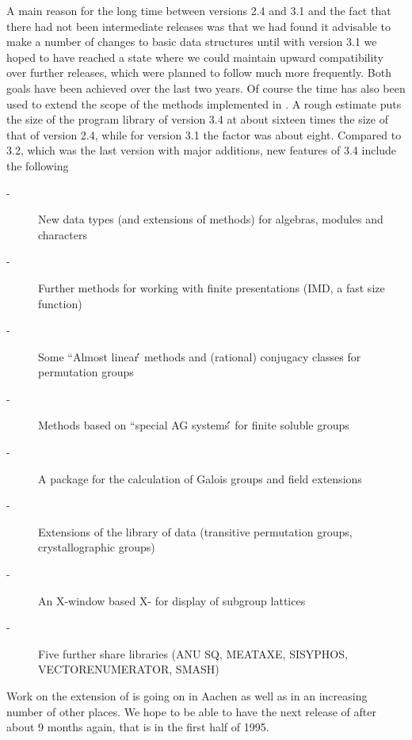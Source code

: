 A main reason for the long time between versions 2.4 and 3.1 and the fact
that there had not been  intermediate releases was that  we had found  it
advisable to make a number of changes to basic data structures until with
version 3.1 we  hoped  to have reached a   state where we could  maintain
upward compatibility over further  releases, which were planned to follow
much more frequently.  Both  goals have been  achieved over the last  two
years. Of course the time has  also been used to extend  the scope of the
methods implemented in {\GAP}.   A rough estimate   puts the size  of the
program library of version 3.4 at about sixteen times the size of that of
version 2.4, while for version 3.1 the factor  was about eight.  Compared
to {\GAP} 3.2,  which  was the  last version  with  major  additions, new
features of {\GAP} 3.4 include the following{\:}
\begin{description}
\item[-] New data types (and extensions of methods) for algebras, 
         modules and characters
\item[-] Further methods for working with finite presentations 
         (IMD, a fast size function)
\item[-] Some ``Almost linear\'\'\, methods and (rational) conjugacy
         classes for permutation groups
\item[-] Methods based on ``special AG systems\'\'\, for finite soluble
         groups
\item[-] A package for the calculation of Galois groups and field
         extensions
\item[-] Extensions of the library of data (transitive permutation
         groups, crystallographic groups)
\item[-] An X-window based X-{\GAP} for display of subgroup lattices
\item[-] Five further share libraries (ANU SQ, MEATAXE, SISYPHOS, 
         VECTORENUMERATOR,  SMASH)
\end{description}

Work on the  extension of {\GAP}  is going on in Aachen  as well as in an
increasing number of  other places. We  hope to be  able to have the next
release of {\GAP} after about  9 months again,  that is in the first half
of 1995.

